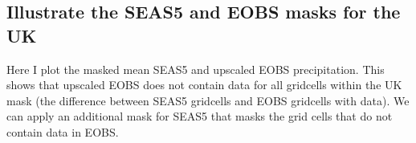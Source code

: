 \documentclass[letterpaper,10pt,english]{sphinxmanual}
\begin{document}
{
\begin{sphinxVerbatim}[commandchars=\\\{\}]
\llap{\color{nbsphinxin}[28]:\,\hspace{\fboxrule}\hspace{\fboxsep}}       
\end{sphinxVerbatim}
}


\subsection{Illustrate the SEAS5 and EOBS masks for the UK}
\label{\detokenize{Notebooks/2.Preprocess/2.3Upscale:Illustrate-the-SEAS5-and-EOBS-masks-for-the-UK}}
Here I plot the masked mean SEAS5 and upscaled EOBS precipitation. This shows that upscaled EOBS does not contain data for all gridcells within the UK mask (the difference between SEAS5 gridcells and EOBS gridcells with data). We can apply an additional mask for SEAS5 that masks the grid cells that do not contain data in EOBS.
\end{document}
